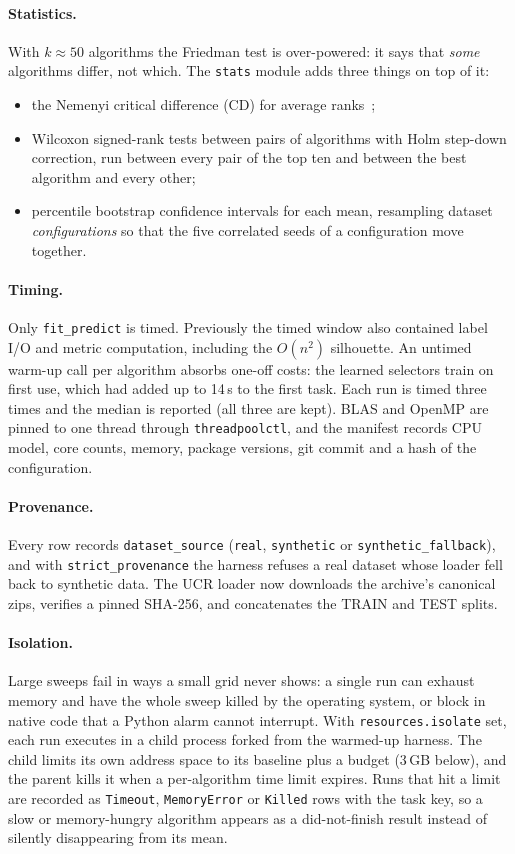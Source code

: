 \documentclass[11pt,a4paper]{article}
\newcommand{\code}[1]{\texttt{#1}}
\begin{document}
\paragraph{Statistics.} With $k \approx 50$ algorithms the Friedman test is
over-powered: it says that \emph{some} algorithms differ, not which. The
\code{stats} module adds three things on top of it:
\begin{itemize}
  \item the Nemenyi critical difference (CD) for average
  ranks~\cite{demsar2006statistical};
  \item Wilcoxon signed-rank tests between pairs of algorithms with Holm
  step-down correction, run between every pair of the top ten and between the
  best algorithm and every other;
  \item percentile bootstrap confidence intervals for each mean, resampling
  dataset \emph{configurations} so that the five correlated seeds of a
  configuration move together.
\end{itemize}

\paragraph{Timing.} Only \code{fit\_predict} is timed. Previously the timed
window also contained label I/O and metric computation, including the
$O(n^2)$ silhouette. An untimed warm-up call per algorithm absorbs one-off
costs: the learned selectors train on first use, which had added up to 14\,s
to the first task. Each run is timed three times and the median is reported
(all three are kept). BLAS and OpenMP are pinned to one thread through
\code{threadpoolctl}, and the manifest records CPU model, core counts,
memory, package versions, git commit and a hash of the configuration.

\paragraph{Provenance.} Every row records \code{dataset\_source}
(\code{real}, \code{synthetic} or \code{synthetic\_fallback}), and with
\code{strict\_provenance} the harness refuses a real dataset whose loader fell
back to synthetic data. The UCR loader now downloads the archive's canonical
zips, verifies a pinned SHA-256, and concatenates the TRAIN and TEST splits.

\paragraph{Isolation.} Large sweeps fail in ways a small grid never shows: a
single run can exhaust memory and have the whole sweep killed by the
operating system, or block in native code that a Python alarm cannot
interrupt. With \code{resources.isolate} set, each run executes in a child
process forked from the warmed-up harness. The child limits its own address
space to its baseline plus a budget (3\,GB below), and the parent kills it
when a per-algorithm time limit expires. Runs that hit a limit are recorded
as \code{Timeout}, \code{MemoryError} or \code{Killed} rows with the task
key, so a slow or memory-hungry algorithm appears as a
did-not-finish result instead of silently disappearing from its mean.
\end{document}
